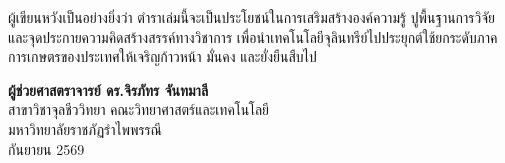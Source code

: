 ผู้เขียนหวังเป็นอย่างยิ่งว่า ตำราเล่มนี้จะเป็นประโยชน์ในการเสริมสร้างองค์ความรู้ ปูพื้นฐานการวิจัย และจุดประกายความคิดสร้างสรรค์ทางวิชาการ เพื่อนำเทคโนโลยีจุลินทรีย์ไปประยุกต์ใช้ยกระดับภาคการเกษตรของประเทศให้เจริญก้าวหน้า มั่นคง และยั่งยืนสืบไป

\vspace{1.5cm}
\begin{flushright}
    \textbf{ผู้ช่วยศาสตราจารย์ ดร.จิรภัทร จันทมาลี}\\
    สาขาวิชาจุลชีววิทยา คณะวิทยาศาสตร์และเทคโนโลยี\\
    มหาวิทยาลัยราชภัฏรำไพพรรณี\\
    กันยายน 2569
\end{flushright}
\clearpage
